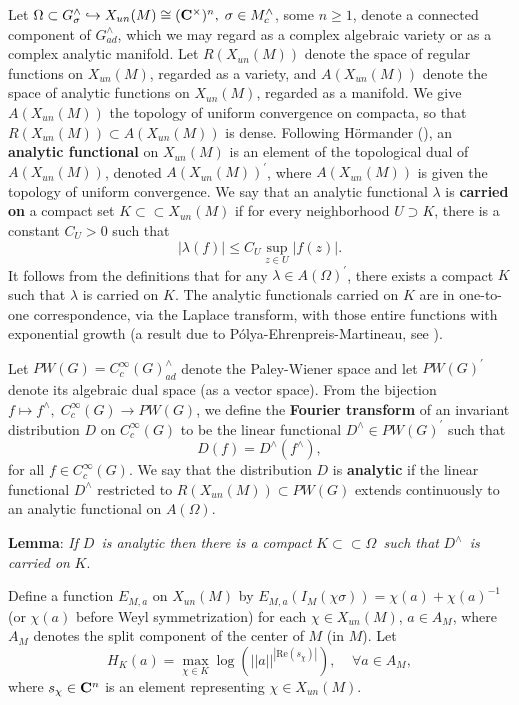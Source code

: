 \documentclass[11pt, a4paper]{article}
\begin{document}
Let $\Omega \subset G_\sigma ^{\wedge }\hookrightarrow X_{un}(M)\cong ({\bf C%
}^{\times })^n,\;\sigma \in M_c^{\wedge }$, some $n\geq 1$, denote a
connected component of $G_{ad}^{\wedge }$, which we may regard as a complex
algebraic variety or as a complex analytic manifold. Let $R(X_{un}(M))$
denote the space of regular functions on $X_{un}(M)$, regarded as a variety,
and $A(X_{un}(M))$ denote the space of analytic functions on $X_{un}(M)$,
regarded as a manifold. We give $A(X_{un}(M))$ the topology of uniform
convergence on compacta, so that $R(X_{un}(M))\subset A(X_{un}(M))$ is
dense. Following H\"ormander (\cite[ch.~IV]{H1}), an {\bf analytic functional} on 
$X_{un}(M)$ is an element of the topological dual of $A(X_{un}(M))$, denoted 
$A(X_{un}(M))^{\prime }$, where $A(X_{un}(M))$ is given the topology of
uniform convergence. We say that an analytic functional $\lambda $ is {\bf %
carried on} a compact set $K\subset \subset X_{un}(M)$ if for every
neighborhood $U\supset K$, there is a constant $C_U>0$ such that
\[
|\lambda (f)|\leq C_U\sup _{z\in U}|f(z)|.
\]
It follows from the definitions that for any $\lambda \in A(\Omega )^{\prime
}$, there exists a compact $K$ such that $\lambda $ is carried on $K$. The
analytic functionals carried on $K$ are in one-to-one correspondence, via
the Laplace transform, with those entire functions with exponential growth
(a result due to P\'olya-Ehrenpreis-Martineau, see \cite[Theorem~4.5.3]{H1}).

Let $PW(G)=C_c^\infty (G)_{ad}^{\wedge }$ denote the Paley-Wiener space and
let $PW(G)^{\prime }$ denote its algebraic dual space (as a vector space).
From the bijection $f\longmapsto f^{\wedge },\;C_c^\infty (G)\rightarrow
PW(G)$, we define the {\bf Fourier transform} of an invariant distribution $%
D$ on $C_c^\infty (G)$ to be the linear functional $D^{\wedge }\in
PW(G)^{\prime }$ such that
\[
D(f)=D^{\wedge }(f^{\wedge }),
\]
for all $f\in C_c^\infty (G)$. We say that the distribution $D$ is 
{\bf analytic} if the linear functional $D^{\wedge }$ restricted to $%
R(X_{un}(M))\subset PW(G)$ extends continuously to an analytic functional on $%
A(\Omega )$.

{\bf Lemma}: {\em If }$D${\em \ is analytic then there is a compact }
$K\subset \subset \Omega ${\em \ such that }$D^{\wedge }${\em \ is carried on 
}$K$.

Define a function $E_{M,a}$ on $X_{un}(M)$ by $E_{M,a}(I_M(\chi \sigma
))=\chi (a)+\chi (a)^{-1}$ (or $\chi (a)$ before Weyl symmetrization) for each $\chi \in X_{un}(M)$, $a\in A_M$, where $A_M$
denotes the split component of the center of $M$ (in $M$). Let
\[
H_K(a)=\max_{\chi\in K}\log (||a||^{|\mathrm{Re}(s_\chi )|}),\;\;\;\;\forall a\in A_M,
\]
where $s_\chi \in {\bf C}^n$ is an element representing $\chi \in X_{un}(M)$.
\end{document}
